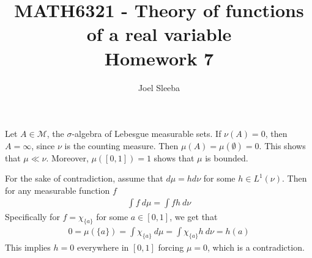 \documentclass[12pt]{exam}
\theoremstyle{plain} %
\theoremstyle{definition} %
\theoremstyle{remark} %
\begin{document}
\title{MATH6321 - Theory of functions of a real variable \\ Homework 7}

\author{
  Joel Sleeba \\
}

\maketitle
\printanswers
\unframedsolutions

\begin{questions}

  \question
  \begin{solution}
    Let $A \in \mathcal{M}$, the $  \sigma$-algebra of Lebesgue
    measurable sets. If $\nu(A) = 0$, then $A = \infty$, since $\nu$ is
    the counting measure. Then $\mu(A) = \mu(\emptyset) = 0$. This
    shows that $\mu \ll \nu$. Moreover, $\mu([0, 1]) = 1$ shows that
    $\mu$ is bounded.

    For the sake of contradiction, assume that $d \mu = h d \nu$ for
    some $h \in L^{1}(\nu)$. Then for any measurable function $f$
    \begin{align*}
      \int f \ d \mu = \int fh \ d \nu
    \end{align*}
    Specifically for $f =  \chi_{\{ a \}}$ for some $  a \in [0, 1]$,
    we get that
    \begin{align*}
      0 = \mu(\{ a \}) = \int  \chi_{\{ a \}} \ d \mu = \int \chi_{\{ a
      \}} h \ d  \nu = h(a)
    \end{align*}
    This implies $h = 0$ everywhere in $[0, 1]$ forcing $\mu = 0$,
    which is a contradiction.

  \end{solution}


\end{questions}
\end{document}
